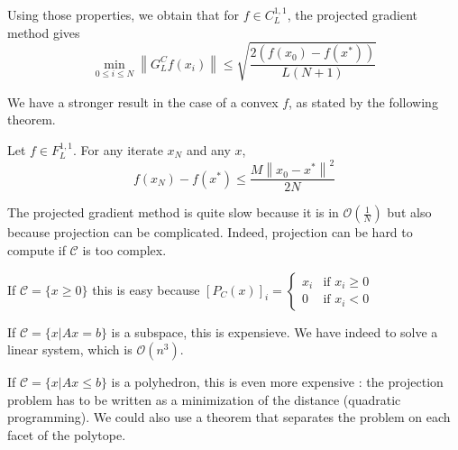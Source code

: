\begin{theorem} Using those properties, we obtain that for $f \in C_L^{1,1}$, the projected gradient method gives
\begin{equation*}
\min_{0\leq i \leq N} \left\|G_L^C f(x_i)\right\| \leq \sqrt{\frac{2(f(x_0) - f(x^*))}{L(N+1)}}
\end{equation*}
\end{theorem}

We have a stronger result in the case of a convex $f$, as stated by the following theorem.
\begin{theorem}
Let $f \in F_L^{1,1}$. For any iterate $x_N$ and any $x$,
\begin{equation*}
f(x_N) - f(x^*) \leq \frac{M\left\|x_0 - x^*\right\|^2}{2N}
\end{equation*}
\end{theorem}


The projected gradient method is quite slow because it is in $\mathcal{O}(\frac{1}{N})$ but also because projection can be complicated. Indeed, projection can be hard to compute if $\mathcal{C}$ is too complex.

\begin{example}
\begin{leftbar}
If $\mathcal{C}=\{x\ge0\}$ this is easy because $[P_C(x)]_i=\left\lbrace
\begin{array}{ll}
x_i & \mbox{if $x_i \ge 0$}\\
0 & \mbox{if $x_i < 0$}
\end{array}
\right.$
\end{leftbar}
\end{example}

\begin{example}
\begin{leftbar}
If $\mathcal{C}=\{x|Ax=b\}$ is a subspace, this is expensieve. We have indeed to solve a linear system, which is $\mathcal{O}(n^3)$.
\end{leftbar}
\end{example}

\begin{example}
\begin{leftbar}
If $\mathcal{C}=\{x|Ax\leq b\}$ is a polyhedron, this is even more expensive : the projection problem has to be written as a minimization of the distance (quadratic programming). We could also use a theorem that separates the problem on each facet of the polytope.
\end{leftbar}
\end{example}


